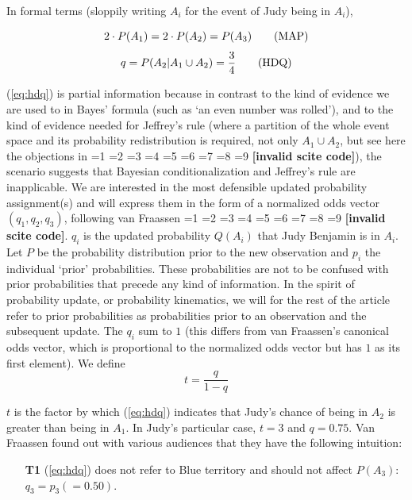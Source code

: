 \documentclass[smallextended]{svjour3}       %
\newcommand{\nial}{\noindent} %
\newcommand{\qnull}[1]{`#1'}
\newcommand{\PageP}{p.~}
\newcommand{\PageP}{}
\newcommand{\scite}[3]{\ifnum#1=1\cite{#2}\else
\ifnum#1=2\cite[{\PageP}~#3]{#2}\else
\ifnum#1=3\cite[{\PageP}~#3]{#2}\else
\ifnum#1=4\cite{#2}\else
\ifnum#1=5\cite{#2}\else
\ifnum#1=6\cite[{\PageP}~#3]{#2}\else
\ifnum#1=7\cite{#2}\else
\ifnum#1=8\cite[{\PageP}~#3]{#2}\else
\ifnum#1=9\cite[{\PageP}~#3]{#2}\else
\textbf{[invalid scite code]}\fi\fi\fi\fi\fi\fi\fi\fi\fi}
\begin{document}
\nial In formal terms (sloppily writing $A_{i}$ for the event of Judy
being in $A_{i}$),

\begin{equation}
  \label{eq:map}
  2\cdot{}P(A_{1})=2\cdot{}P(A_{2})=P(A_{3})\tag{\mbox{MAP}}
\end{equation}
\begin{equation}
  \label{eq:hdq}
  q=P(A_{2}|A_{1}\cup{}A_{2})=\frac{3}{4}\tag{\mbox{HDQ}}
\end{equation}

\nial ({\ref{eq:hdq}}) is partial information because in contrast to
the kind of evidence we are used to in Bayes' formula (such as
\qnull{an even number was rolled}), and to the kind of evidence needed
for Jeffrey's rule (where a partition of the whole event space and its
probability redistribution is required, not only $A_{1}\cup{}A_{2}$,
but see here the objections in \scite{7}{douvenromeijn09}{}), the
scenario suggests that Bayesian conditionalization and Jeffrey's rule
are inapplicable. We are interested in the most defensible updated
probability assignment(s) and will express them in the form of a
normalized odds vector $(q_{1},q_{2},q_{3})$, following van Fraassen
\scite{1}{fraassen81}{}. $q_{i}$ is the updated probability $Q(A_{i})$
that Judy Benjamin is in $A_{i}$. Let $P$ be the probability
distribution prior to the new observation and $p_{i}$ the individual
\qnull{prior} probabilities. These probabilities are not to be
confused with prior probabilities that precede any kind of
information. In the spirit of probability update, or probability
kinematics, we will for the rest of the article refer to prior
probabilities as probabilities prior to an observation and the
subsequent update. The $q_{i}$ sum to $1$ (this differs from van
Fraassen's canonical odds vector, which is proportional to the
normalized odds vector but has $1$ as its first element). We define
\begin{displaymath}
  t=\frac{q}{1-q}
\end{displaymath}

\nial $t$ is the factor by which ({\ref{eq:hdq}}) indicates that
Judy's chance of being in $A_{2}$ is greater than being in $A_{1}$. In
Judy's particular case, $t=3$ and $q=0.75$. Van Fraassen found out
with various audiences that they have the following intuition:

\begin{enumerate}
  \item[\textbf{T1}] ({\ref{eq:hdq}}) does not refer to Blue territory and
  should not affect $P(A_{3})$: $q_{3}=p_{3}(=0.50)$.
\end{enumerate}
\end{document}

